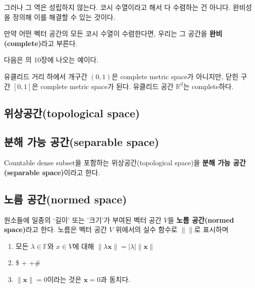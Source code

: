 \documentclass[b5paper,]{scrbook}
\theoremstyle{plain}
\theoremstyle{definition}
\numberwithin{equation}{section}
\let\BeginKnitrBlock\begin \let\EndKnitrBlock\end
\begin{document}
그러나 그 역은 성립하지 않는다. 코시 수열이라고 해서 다 수렴하는 건 아니다. 완비성을 정의해 이를 해결할 수 있는 것이다.

\BeginKnitrBlock{definition}[벡터 공간의 완비성]
\protect\hypertarget{def:unnamed-chunk-24}{}{\label{def:unnamed-chunk-24} {} }만약 어떤 벡터 공간의 모든 코시 수열이 수렴한다면, 우리는 그 공간을 \textbf{완비(complete)}라고 부른다.
\EndKnitrBlock{definition}

다음은 \citep{Kokoszka2017}의 10장에 나오는 예이다.

\BeginKnitrBlock{example}[유클리드 공간에서의 완비성]
\protect\hypertarget{exm:unnamed-chunk-25}{}{\label{exm:unnamed-chunk-25} {} }유클리드 거리 하에서 개구간 \((0,1)\)은 complete metric space가 아니지만, 닫힌 구간 \([0,1]\)은 complete metric space가 된다. 유클리드 공간 \(\mathbb{R}^{d}\)는 complete하다.
\EndKnitrBlock{example}

\hypertarget{topological-space}{%
\subsection{위상공간(topological space)}\label{topological-space}}

\hypertarget{--separable-space}{%
\subsection{분해 가능 공간(separable space)}\label{--separable-space}}

Countable dense subset을 포함하는 위상공간(topological space)을 \textbf{분해 가능 공간(separable space)}이라고 한다.

\hypertarget{-normed-space}{%
\subsection{노름 공간(normed space)}\label{-normed-space}}

\BeginKnitrBlock{definition}[노름 공간]
\protect\hypertarget{def:unnamed-chunk-26}{}{\label{def:unnamed-chunk-26} {} }원소들에 일종의 `길이' 또는 '크기'가 부여된 벡터 공간 \(V\)을 \textbf{노름 공간(normed space)}라고 한다. 노름은 벡터 공간 \(V\) 위에서의 실수 함수로 \(\| \|\)로 표시하며

\begin{enumerate}
\def\labelenumi{\arabic{enumi}.}
\item
  모든 \(\lambda\in\mathbb{F}\)와 \(x\in V\)에 대해 \(\|\lambda \mathbf{x}\| = |\lambda|\|\mathbf{x}\|\)
\item
  \$\textbar{} +\textbar{} \leq \textbar{}\textbar{} +\textbar{}\textbar{}\#
\item
  \(\|\mathbf{x}\|=0\)이라는 것은 \(\mathbf{x}=0\)과 동치다.
\end{enumerate}
\EndKnitrBlock{definition}
\end{document}
